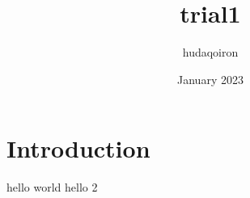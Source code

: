 \documentclass{article}
\title{trial1}
\author{hudaqoiron }
\date{January 2023}
\begin{document}
\maketitle

\section{Introduction}
hello world 
hello 2
\end{document}
